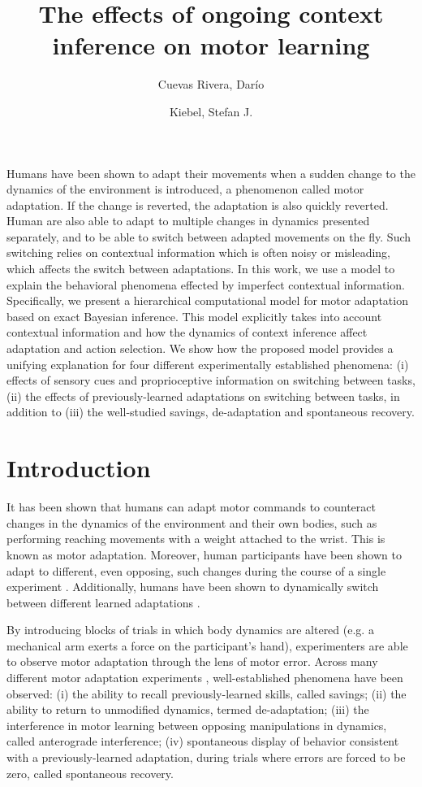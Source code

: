 \documentclass[a4paper,doc,floatsintext,natbib]{apa6}%
\title{The effects of ongoing context inference on motor learning}
\author[1,2]{Cuevas Rivera, Darío}
\author[1,2]{Kiebel, Stefan J.}
\affil[1]{Chair of Neuroimaging, Faculty of Psychology. Technische Universität Dresden, 01062 Dresden, Germany.}
\affil[2]{Centre for Tactile Internet with Human-in-the-Loop (CeTI)}
\affiliation{~}
\begin{document}
\maketitle

Humans have been shown to adapt their movements when a sudden change to the dynamics of the environment is introduced, a phenomenon called motor adaptation. If the change is reverted, the adaptation is also quickly reverted. Human are also able to adapt to multiple changes in dynamics presented separately, and to be able to switch between adapted movements on the fly. Such switching relies on contextual information which is often noisy or misleading, which affects the switch between adaptations. In this work, we use a model to explain the behavioral phenomena effected by imperfect contextual information. Specifically, we present a hierarchical computational model for motor adaptation based on exact Bayesian inference. This model explicitly takes into account contextual information and how the dynamics of context inference affect adaptation and action selection. We show how the proposed model provides a unifying explanation for four different experimentally established phenomena: (i) effects of sensory cues and proprioceptive information on switching between tasks, (ii) the effects of previously-learned adaptations on switching between tasks, in addition to (iii) the well-studied savings, de-adaptation and spontaneous recovery.


\section{Introduction}
It has been shown that humans can adapt motor commands to counteract changes in the dynamics of the environment and their own bodies, such as performing reaching movements with a weight attached to the wrist. This is known as motor adaptation. Moreover, human participants have been shown to adapt to different, even opposing, such changes during the course of a single experiment \citep{Gandolfo_Motor_1996,Shadmehr_Functional_1997}. Additionally, humans have been shown to dynamically switch between different learned adaptations \citep{Davidson_Scaling_2004,Ethier_Spontaneous_2008,Lee_Dual_2009}.

By introducing blocks of trials in which body dynamics are altered (e.g. a mechanical arm exerts a force on the participant's hand), experimenters are able to observe motor adaptation through the lens of motor error. Across many different motor adaptation experiments \citep[e.g.][]{Gandolfo_Motor_1996,Shadmehr_Adaptive_1994,Davidson_Scaling_2004}, well-established phenomena have been observed: (i) the ability to recall previously-learned skills, called savings; (ii) the ability to return to unmodified dynamics, termed de-adaptation; (iii) the interference in motor learning between opposing manipulations in dynamics, called anterograde interference; (iv) spontaneous display of behavior consistent with a previously-learned adaptation, during trials where errors are forced to be zero, called spontaneous recovery.
\end{document}
